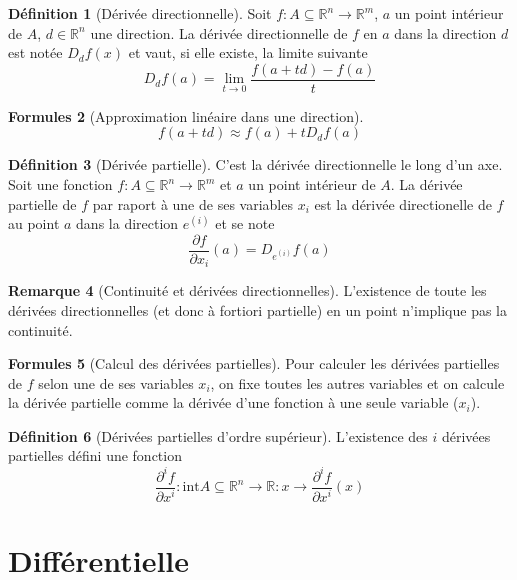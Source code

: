 \documentclass[11pt,a4paper]{article}
\theoremstyle{definition}
\newtheorem{mydef}{Définition}[section]
\newtheorem{myrem}[mydef]{Remarque}
\newtheorem{myform}[mydef]{Formules}
\newcommand{\R}{\mathbb{R}}
\newcommand{\fl}{\rightarrow}
\newcommand{\pa}{\partial}
\begin{document}
\begin{mydef}[Dérivée directionnelle] Soit $f : A \subseteq \R^n \fl \R^m$, $a$ un point intérieur de $A$, $d \in \R^n$ une direction. La dérivée directionnelle de $f$ en $a$ dans la direction $d$ est notée $D_df(x)$ et vaut, si elle existe, la limite suivante
\[ D_df(a) = \lim_{t \fl 0} \frac{f(a+td) - f(a)}{t} \]
\end{mydef}

\begin{myform}[Approximation linéaire dans une direction]
\[ f(a+td) \approx f(a) + t D_df(a) \]
\end{myform}

\begin{mydef}[Dérivée partielle]
C'est la dérivée directionnelle le long d'un axe.
Soit une fonction $f : A\subseteq \R^n \fl \R^m$ et $a$ un point intérieur de $A$. La dérivée partielle de $f$ par raport à une de ses variables $x_i$ est la dérivée directionelle de $f$ au point $a$ dans la direction $e^{(i)}$ et se note
\[ \frac{\pa f}{\pa x_i}(a) = D_{e^{(i)}} f(a) \]
\end{mydef}

\begin{myrem}[Continuité et dérivées directionnelles]
L'existence de toute les dérivées directionnelles (et donc à fortiori partielle) en un point n'implique pas la continuité.
\end{myrem}

\begin{myform}[Calcul des dérivées partielles] Pour calculer les dérivées partielles de $f$ selon une de ses variables $x_i$, on fixe toutes les autres variables et on calcule la dérivée partielle comme la dérivée d'une fonction à une seule variable ($x_i$).
\end{myform}

\begin{mydef}[Dérivées partielles d'ordre supérieur]
L'existence des $i$\ieme{} dérivées partielles défini une fonction
\[ \frac{\pa^i f}{\pa x^i} : \mathrm{int} A \subseteq \R^n \fl \R : x \fl \frac{\pa^i f}{\pa x^i}(x) \]
\end{mydef}


\section{Différentielle}
\end{document}
